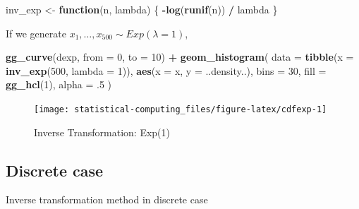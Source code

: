 \documentclass[]{book}
\newenvironment{Shaded}{\begin{snugshade}}{\end{snugshade}}
\newcommand{\ControlFlowTok}[1]{\textcolor[rgb]{0.13,0.29,0.53}{\textbf{#1}}}
\newcommand{\DataTypeTok}[1]{\textcolor[rgb]{0.13,0.29,0.53}{#1}}
\newcommand{\DecValTok}[1]{\textcolor[rgb]{0.00,0.00,0.81}{#1}}
\newcommand{\FloatTok}[1]{\textcolor[rgb]{0.00,0.00,0.81}{#1}}
\newcommand{\KeywordTok}[1]{\textcolor[rgb]{0.13,0.29,0.53}{\textbf{#1}}}
\newcommand{\NormalTok}[1]{#1}
\newcommand{\OperatorTok}[1]{\textcolor[rgb]{0.81,0.36,0.00}{\textbf{#1}}}
\newcommand{\StringTok}[1]{\textcolor[rgb]{0.31,0.60,0.02}{#1}}
\theoremstyle{definition}
\theoremstyle{definition}
\theoremstyle{definition}
\theoremstyle{remark}
\begin{document}
\begin{Shaded}
\begin{Highlighting}[]
\NormalTok{inv_exp <-}\StringTok{ }\ControlFlowTok{function}\NormalTok{(n, lambda) \{}
  \OperatorTok{-}\KeywordTok{log}\NormalTok{(}\KeywordTok{runif}\NormalTok{(n)) }\OperatorTok{/}\StringTok{ }\NormalTok{lambda}
\NormalTok{\}}
\end{Highlighting}
\end{Shaded}

If we generate \(x_1, \ldots, x_{500} \sim Exp(\lambda = 1)\),

\begin{Shaded}
\begin{Highlighting}[]
\KeywordTok{gg_curve}\NormalTok{(dexp, }\DataTypeTok{from =} \DecValTok{0}\NormalTok{, }\DataTypeTok{to =} \DecValTok{10}\NormalTok{) }\OperatorTok{+}
\StringTok{  }\KeywordTok{geom_histogram}\NormalTok{(}
    \DataTypeTok{data =} \KeywordTok{tibble}\NormalTok{(}\DataTypeTok{x =} \KeywordTok{inv_exp}\NormalTok{(}\DecValTok{500}\NormalTok{, }\DataTypeTok{lambda =} \DecValTok{1}\NormalTok{)),}
    \KeywordTok{aes}\NormalTok{(}\DataTypeTok{x =}\NormalTok{ x, }\DataTypeTok{y =}\NormalTok{ ..density..),}
    \DataTypeTok{bins =} \DecValTok{30}\NormalTok{,}
    \DataTypeTok{fill =} \KeywordTok{gg_hcl}\NormalTok{(}\DecValTok{1}\NormalTok{),}
    \DataTypeTok{alpha =} \FloatTok{.5}
\NormalTok{  )}
\end{Highlighting}
\end{Shaded}

\begin{figure}[H]

{\centering \texttt{[image: statistical-computing\_files/figure-latex/cdfexp-1]} 

}

\caption{Inverse Transformation: Exp(1)}\label{fig:cdfexp}
\end{figure}

\hypertarget{discrete-case}{%
\subsection{Discrete case}\label{discrete-case}}

\begin{algorithm}[H] \label{alg:alginv2}
  \SetAlgoLined
  \caption{Inverse transformation method in discrete case}
\end{algorithm}
\end{document}
